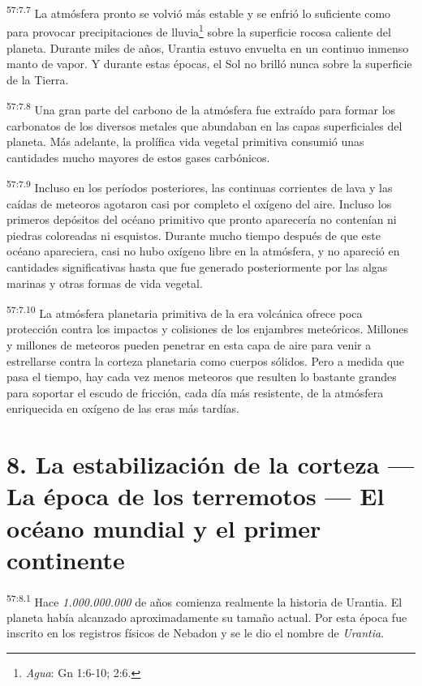 \par
\textsuperscript{57:7.7} La atmósfera pronto se volvió más estable y se enfrió lo suficiente como para provocar precipitaciones de lluvia\footnote{\textit{Agua}: Gn 1:6-10; 2:6.} sobre la superficie rocosa caliente del planeta. Durante miles de años, Urantia estuvo envuelta en un continuo inmenso manto de vapor. Y durante estas épocas, el Sol no brilló nunca sobre la superficie de la Tierra.

\par
\textsuperscript{57:7.8} Una gran parte del carbono de la atmósfera fue extraído para formar los carbonatos de los diversos metales que abundaban en las capas superficiales del planeta. Más adelante, la prolífica vida vegetal primitiva consumió unas cantidades mucho mayores de estos gases carbónicos.

\par
\textsuperscript{57:7.9} Incluso en los períodos posteriores, las continuas corrientes de lava y las caídas de meteoros agotaron casi por completo el oxígeno del aire. Incluso los primeros depósitos del océano primitivo que pronto aparecería no contenían ni piedras coloreadas ni esquistos. Durante mucho tiempo después de que este océano apareciera, casi no hubo oxígeno libre en la atmósfera, y no apareció en cantidades significativas hasta que fue generado posteriormente por las algas marinas y otras formas de vida vegetal.

\par
\textsuperscript{57:7.10} La atmósfera planetaria primitiva de la era volcánica ofrece poca protección contra los impactos y colisiones de los enjambres meteóricos. Millones y millones de meteoros pueden penetrar en esta capa de aire para venir a estrellarse contra la corteza planetaria como cuerpos sólidos. Pero a medida que pasa el tiempo, hay cada vez menos meteoros que resulten lo bastante grandes para soportar el escudo de fricción, cada día más resistente, de la atmósfera enriquecida en oxígeno de las eras más tardías.

\section*{8. La estabilización de la corteza --- La época de los terremotos --- El océano mundial y el primer continente}
\par
\textsuperscript{57:8.1} Hace \textit{1.000.000.000} de años comienza realmente la historia de Urantia. El planeta había alcanzado aproximadamente su tamaño actual. Por esta época fue inscrito en los registros físicos de Nebadon y se le dio el nombre de \textit{Urantia}.

